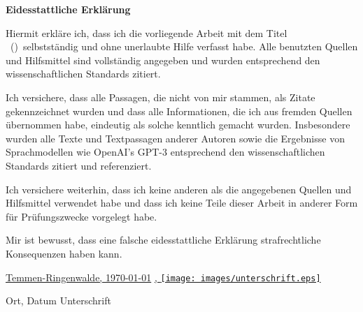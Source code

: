 \textbf{Eidesstattliche Erklärung}\vspace{0.3cm}

Hiermit erkläre ich, dass ich die vorliegende Arbeit mit dem Titel \glqq \bookTitle\ (\textit{\bookSubTitle})\grqq\ selbstständig und ohne unerlaubte Hilfe verfasst habe. Alle benutzten Quellen und Hilfsmittel sind vollständig angegeben und wurden entsprechend den wissenschaftlichen Standards zitiert.\vspace{0.3cm}

Ich versichere, dass alle Passagen, die nicht von mir stammen, als Zitate gekennzeichnet wurden und dass alle Informationen, die ich aus fremden Quellen übernommen habe, eindeutig als solche kenntlich gemacht wurden. Insbesondere wurden alle Texte und Textpassagen anderer Autoren sowie die Ergebnisse von Sprachmodellen wie OpenAI's GPT-3 entsprechend den wissenschaftlichen Standards zitiert und referenziert.\vspace{0.3cm}

Ich versichere weiterhin, dass ich keine anderen als die angegebenen Quellen und Hilfsmittel verwendet habe und dass ich keine Teile dieser Arbeit in anderer Form für Prüfungszwecke vorgelegt habe.\vspace{0.3cm}

Mir ist bewusst, dass eine falsche eidesstattliche Erklärung strafrechtliche Konsequenzen haben kann.\vspace{2.0cm}



\underline{Temmen-Ringenwalde, \today} \hspace{1cm} \underline{,
	\texttt{[image: images/unterschrift.eps]}
	\hspace{2cm}
}

\hspace{0.2cm} Ort, Datum \hspace{5.5cm} Unterschrift






